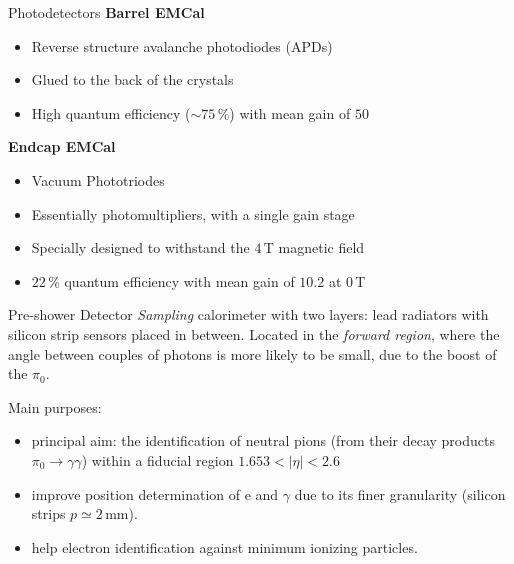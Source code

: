 \documentclass[10pt]{beamer}
\begin{document}
\begin{frame}{Photodetectors}
    \textbf{Barrel EMCal}
    \begin{itemize}
        \item Reverse structure avalanche photodiodes (APDs)
        \item Glued to the back of the crystals
        \item High quantum efficiency ($\sim 75$\,\%) with mean gain of $50$
    \end{itemize}{}
    
    \textbf{Endcap EMCal}
    \begin{itemize}
        \item Vacuum Phototriodes
        \item Essentially photomultipliers, with a single gain stage
        \item Specially designed to withstand the $4$\,T magnetic field
        \item $22$\,\% quantum efficiency with mean gain of $10.2$ at $0$\,T
    \end{itemize}
\end{frame}

\begin{frame}{Pre-shower Detector}
    \emph{Sampling} calorimeter with two layers: lead radiators with silicon strip sensors placed in between.
    Located in the \emph{forward region}, where the angle between couples of photons is more likely to be small, due to the boost of the $\pi_0$.
    
    Main purposes:
    \begin{itemize}
        \item principal aim: the identification of neutral pions (from their decay products $\pi_0 \rightarrow \gamma \gamma$) within a fiducial region $1.653 < |\eta| < 2.6 $  
        \item improve position determination of e and $\gamma$ due to its finer granularity (silicon strips $p\simeq2\,$mm).
        \item help electron identification against minimum ionizing particles.
    \end{itemize}{}
    
\end{frame}
\end{document}
